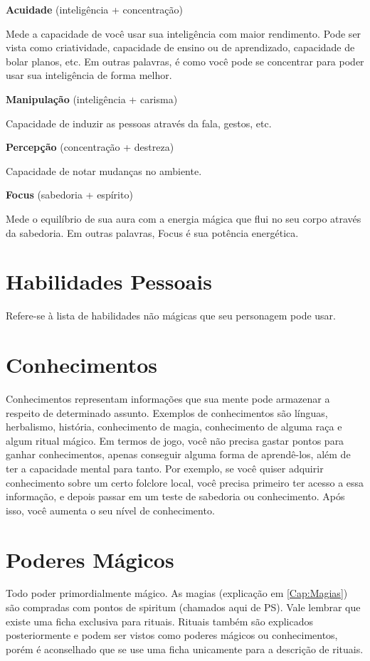\textbf{Acuidade} (inteligência + concentração)

Mede a capacidade de você usar sua inteligência com maior rendimento. Pode ser vista como criatividade, capacidade de ensino ou de aprendizado, capacidade de bolar planos, etc. Em outras palavras, é como você pode se concentrar para poder usar sua inteligência de forma melhor.

\textbf{Manipulação} (inteligência + carisma)

Capacidade de induzir as pessoas através da fala, gestos, etc. 

\textbf{Percepção} (concentração + destreza)

Capacidade de notar mudanças no ambiente.

\textbf{Focus} (sabedoria + espírito)

Mede o equilíbrio de sua aura com a energia mágica que flui no seu corpo através da sabedoria. Em outras palavras, Focus é sua potência energética.

\section{Habilidades Pessoais}

Refere-se à lista de habilidades não mágicas que seu personagem pode usar. 

\section{Conhecimentos}

Conhecimentos representam informações que sua mente pode armazenar a respeito de determinado assunto. Exemplos de conhecimentos são línguas, herbalismo, história, conhecimento de magia, conhecimento de alguma raça e algum ritual mágico. Em termos de jogo, você não precisa gastar pontos para ganhar conhecimentos, apenas conseguir alguma forma de aprendê-los, além de ter a capacidade mental para tanto. 
Por exemplo, se você quiser adquirir conhecimento sobre um certo folclore local, você precisa primeiro ter acesso a essa informação, e depois passar em um teste de sabedoria ou conhecimento. Após isso, você aumenta o seu nível de conhecimento.

\section{Poderes Mágicos}

Todo poder primordialmente mágico. As magias (explicação em \ref{Cap:Magias}) são compradas com pontos de spiritum (chamados aqui de PS). Vale lembrar que existe uma ficha exclusiva para rituais. Rituais também são explicados posteriormente e podem ser vistos como poderes mágicos ou conhecimentos, porém é aconselhado que se use uma ficha unicamente para a descrição de rituais.

